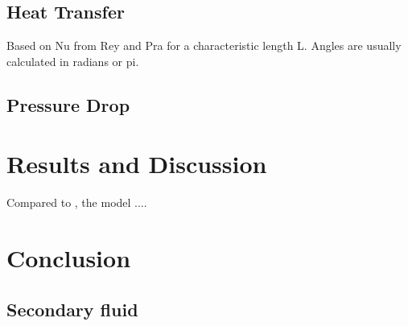 \documentclass[11pt]{article} %
\begin{document}
\subsection{Heat Transfer}

Based on \gls{Nu} from \gls{Rey} and \gls{Pra} for a characteristic length \gls{L}. Angles are usually calculated in radians or \gls{pi}.


\subsection{Pressure Drop}



\section{Results and Discussion}

Compared to \cite{Kaern2011b}, the model .... 


\cite{Zhang2006}

\cite{Zhang2009}

\section{Conclusion}





\subsection{Secondary fluid}
\end{document}
